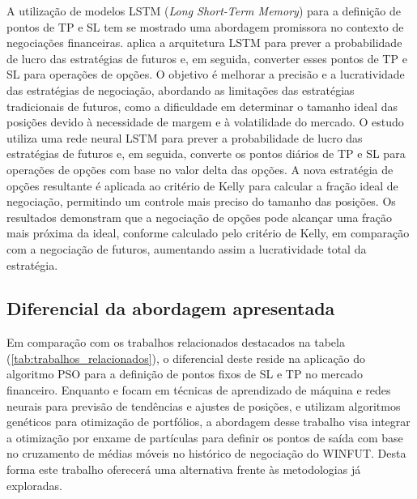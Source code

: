\documentclass{iftex2024}
\begin{document}
A utilização de modelos LSTM (\textit{Long Short-Term Memory}) para a definição de
pontos de TP e SL tem se mostrado uma abordagem promissora no contexto de negociações
financeiras. \textcite{wu} aplica a arquitetura LSTM para prever a probabilidade de
lucro das estratégias de futuros e, em seguida, converter esses pontos de TP e SL para
operações de opções. O objetivo é melhorar a precisão e a lucratividade das estratégias
de negociação, abordando as limitações das estratégias tradicionais de futuros, como a
dificuldade em determinar o tamanho ideal das posições devido à necessidade de margem
e à volatilidade do mercado. O estudo utiliza uma rede neural LSTM para prever a
probabilidade de lucro das estratégias de futuros e, em seguida, converte os pontos diários
de TP e SL para operações de opções com base no valor delta das opções. A nova
estratégia de opções resultante é aplicada ao critério de Kelly para calcular a fração
ideal de negociação, permitindo um controle mais preciso do tamanho das posições. Os
resultados demonstram que a negociação de opções pode alcançar uma fração mais próxima
da ideal, conforme calculado pelo critério de Kelly, em comparação com a negociação de
futuros, aumentando assim a lucratividade total da estratégia.

\subsection{Diferencial da abordagem apresentada}

Em comparação com os trabalhos relacionados destacados na tabela (\ref{tab:trabalhos_relacionados}), o
diferencial deste reside na aplicação do algoritmo PSO
para a definição de pontos fixos de SL e TP no mercado financeiro. Enquanto \textcite{Mazen2023} e \textcite{wu} focam 
em técnicas de aprendizado de máquina e redes neurais
para previsão de tendências e ajustes de posições, e \textcite{8616576} utilizam algoritmos
genéticos para otimização de portfólios, a abordagem desse trabalho visa integrar a otimização por
enxame de partículas para definir os pontos de saída com base no cruzamento de médias
móveis no histórico de negociação do WINFUT. Desta forma
este trabalho oferecerá uma alternativa frente às metodologias já exploradas.
\end{document}
